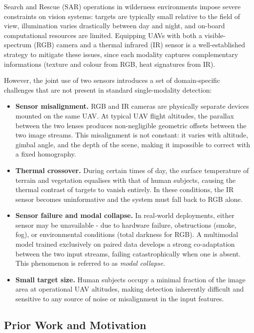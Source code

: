 \documentclass[12pt, a4paper]{article}
\begin{document}
Search and Rescue (SAR) operations in wilderness environments impose severe constraints on vision systems: targets are typically small relative to the field of view, illumination varies drastically between day and night, and on-board computational resources are limited. Equipping UAVs with both a visible-spectrum (RGB) camera and a thermal infrared (IR) sensor is a well-established strategy to mitigate these issues, since each modality captures complementary informations (texture and colour from RGB, heat signatures from IR).
 
However, the joint use of two sensors introduces a set of domain-specific challenges that are not present in standard single-modality detection:
 
\begin{itemize}
    \item \textbf{Sensor misalignment.} RGB and IR cameras are physically separate devices mounted on the same UAV. At typical UAV flight altitudes, the parallax between the two lenses produces non-negligible geometric offsets between the two image streams. This misalignment is not constant: it varies with altitude, gimbal angle, and the depth of the scene, making it impossible to correct with a fixed homography.
    \item \textbf{Thermal crossover.} During certain times of day, the surface temperature of terrain and vegetation equalises with that of human subjects, causing the thermal contrast of targets to vanish entirely. In these conditions, the IR sensor becomes uninformative and the system must fall back to RGB alone.
    \item \textbf{Sensor failure and modal collapse.} In real-world deployments, either sensor may be unavailable - due to hardware failure, obstructions (smoke, fog), or environmental conditions (total darkness for RGB). A multimodal model trained exclusively on paired data develops a strong co-adaptation between the two input streams, failing catastrophically when one is absent. This phenomenon is referred to as \textit{modal collapse}.
    \item \textbf{Small target size.} Human subjects occupy a minimal fraction of the image area at operational UAV altitudes, making detection inherently difficult and sensitive to any source of noise or misalignment in the input features.
\end{itemize}
 
\subsection{Prior Work and Motivation}
 
\end{document}
